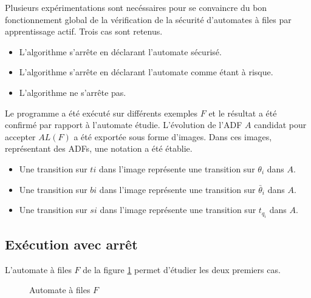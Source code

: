 Plusieurs expérimentations sont necéssaires pour se convaincre du bon fonctionnement global de la vérification de la sécurité d'automates à files par apprentissage actif. Trois cas sont retenus.
\begin{itemize}
  \item L'algorithme s'arrête en déclarant l'automate sécurisé.
  \item L'algorithme s'arrête en déclarant l'automate comme étant à risque.
  \item L'algorithme ne s'arrête pas.
\end{itemize}

Le programme a été exécuté sur différents exemples $F$ et le résultat a été confirmé par rapport à l'automate étudie. L'évolution de l'ADF $A$ candidat pour accepter $AL(F)$ a été exportée sous forme d'images. Dans ces images, représentant des ADFs, une notation a été établie.
\begin{itemize}
  \item Une transition sur $ti$ dans l'image représente une transition sur $\theta_i$ dans $A$.
  \item Une transition sur $bi$ dans l'image représente une transition sur $\bar{\theta}_i$ dans $A$.
  \item Une transition sur $si$ dans l'image représente une transition sur $t_{q_i}$ dans $A$.
\end{itemize}



\subsection{Exécution avec arrêt}

L'automate à files $F$ de la figure \ref{fig:fex2} permet d'étudier les deux premiers cas.

\begin{figure}[H]
    \centering
    \caption{Automate à files $F$}\label{fig:fex2}
\end{figure}

